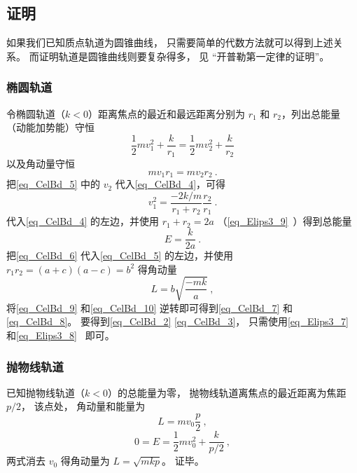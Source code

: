 \subsection{证明}
如果我们已知质点轨道为圆锥曲线， 只需要简单的代数方法就可以得到上述关系。 而证明轨道是圆锥曲线则要复杂得多， 见 “开普勒第一定律的证明”。

\subsubsection{椭圆轨道}
令椭圆轨道（$k<0$）距离焦点的最近和最远距离分别为 $r_1$ 和 $r_2$，列出总能量（动能加势能）守恒
\begin{equation}\label{eq_CelBd_4}
\frac12 m v_1^2 + \frac{k}{r_1} = \frac12 mv_2^2 + \frac{k}{r_2}
\end{equation}
以及角动量守恒
\begin{equation}\label{eq_CelBd_5}
mv_1 r_1 = mv_2 r_2~.
\end{equation}
把\autoref{eq_CelBd_5} 中的 $v_2$ 代入\autoref{eq_CelBd_4}，可得
\begin{equation}\label{eq_CelBd_6}
v_1^2 = \frac{-2k/m}{r_1 + r_2} \frac{r_2}{r_1}~.
\end{equation}
代入\autoref{eq_CelBd_4} 的左边，并使用 $r_1+r_2=2a$ （\autoref{eq_Elips3_9}~）得到总能量
\begin{equation}\label{eq_CelBd_9}
E = \frac{k}{2a}~.
\end{equation}
把\autoref{eq_CelBd_6} 代入\autoref{eq_CelBd_5} 的左边，并使用 $r_1 r_2 = (a+c)(a-c) =b^2$ %
得角动量
\begin{equation}\label{eq_CelBd_10}
L = b\sqrt{\frac{-mk}{a}}~,
\end{equation}
将\autoref{eq_CelBd_9} 和\autoref{eq_CelBd_10} 逆转即可得到\autoref{eq_CelBd_7} 和\autoref{eq_CelBd_8}。 要得到\autoref{eq_CelBd_2} \autoref{eq_CelBd_3}， 只需使用\autoref{eq_Elips3_7}~ 和\autoref{eq_Elips3_8}~ 即可。

\subsubsection{抛物线轨道}
已知抛物线轨道（$k<0$）的总能量为零， 抛物线轨道离焦点的最近距离为焦距 $p/2$， 该点处， 角动量和能量为
\begin{equation}
L = mv_0 \frac p2~,
\end{equation}
\begin{equation}
0 = E = \frac 12 mv_0^2 + \frac{k}{p/2}~,
\end{equation}
两式消去 $v_0$ 得角动量为 $L = \sqrt{mkp}$。 证毕。

